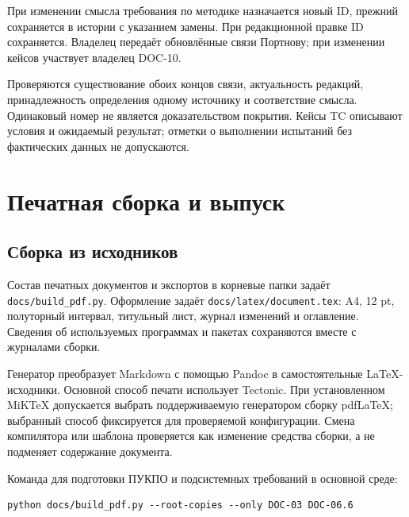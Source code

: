 \documentclass[12pt,a4paper]{article}
\begin{document}
При изменении смысла требования по методике назначается новый ID, прежний сохраняется в истории с указанием замены. При редакционной правке ID сохраняется. Владелец передаёт обновлённые связи Портнову; при изменении кейсов участвует владелец DOC-10.

Проверяются существование обоих концов связи, актуальность редакций, принадлежность определения одному источнику и соответствие смысла. Одинаковый номер не является доказательством покрытия. Кейсы TC описывают условия и ожидаемый результат; отметки о выполнении испытаний без фактических данных не допускаются.

\section{Печатная сборка и выпуск}\label{8-ux43fux435ux447ux430ux442ux43dux430ux44f-ux441ux431ux43eux440ux43aux430-ux438-ux432ux44bux43fux443ux441ux43a}

\hypertarget{8-печатная-сборка-и-выпуск}{}

\subsection{Сборка из исходников}\label{ux441ux431ux43eux440ux43aux430-ux438ux437-ux438ux441ux445ux43eux434ux43dux438ux43aux43eux432}

\hypertarget{сборка-из-исходников}{}

Состав печатных документов и экспортов в корневые папки задаёт \texttt{docs/\allowbreak{}build\_\allowbreak{}pdf.\allowbreak{}py}. Оформление задаёт \texttt{docs/\allowbreak{}latex/\allowbreak{}document.\allowbreak{}tex}: A4, 12 pt, полуторный интервал, титульный лист, журнал изменений и оглавление. Сведения об используемых программах и пакетах сохраняются вместе с журналами сборки.

Генератор преобразует Markdown с помощью Pandoc в самостоятельные LaTeX-исходники. Основной способ печати использует Tectonic. При установленном MiKTeX допускается выбрать поддерживаемую генератором сборку pdfLaTeX; выбранный способ фиксируется для проверяемой конфигурации. Смена компилятора или шаблона проверяется как изменение средства сборки, а не подменяет содержание документа.

Команда для подготовки ПУКПО и подсистемных требований в основной среде:

\begin{verbatim}
python docs/build_pdf.py --root-copies --only DOC-03 DOC-06.6
\end{verbatim}
\end{document}
